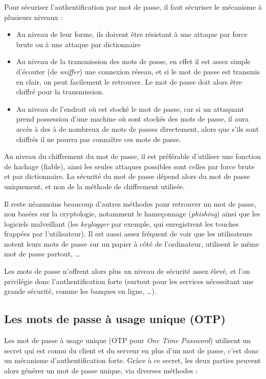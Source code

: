 Pour sécuriser l'authentification par mot de passe, il faut
sécuriser le mécanisme à plusieurs niveaux :
\begin{itemize}
  \item Au niveau de leur forme, ils doivent
être résistant à une attaque par force brute ou à une attaque 
par dictionnaire
  \item Au niveau de la transmission des mots de passe, en effet
il est assez simple d'écouter (de \emph{sniffer}) une connexion
réseau, et si le mot de passe est transmis en clair, on peut
facilement le retrouver. Le mot de passe doit alors être chiffré
pour la transmission.
  \item Au niveau de l'endroit où est stocké le mot de passe, car
si un attaquant prend possession d'une machine où sont stockés
des mots de passe, il aura accès à des à de nombreux de mots
de passes directement, alors que s'ils sont
chiffrés il ne pourra pas connaître ces mots de passe.
\\
\end{itemize}

Au niveau du chiffrement du mot de passe, il est préférable
d'utiliser une fonction de hachage (fiable), ainsi les seules
attaques possibles sont celles par force brute et par
dictionnaire. La sécurité du mot de passe dépend alors du mot de
passe uniquement, et non de la méthode de chiffrement utilisée.

Il reste néanmoins beaucoup d'autres méthodes pour retrouver un mot de
passe, non basées sur la cryptologie, notamment le hameçonnage
(\emph{phishing}) ainsi que les logiciels malveillant (les
\emph{keylogger} par exemple, qui enregistrent les touches
frappées par l'utilisateur). Il est aussi assez fréquent de voir
que les utilisateurs notent leurs mots de passe sur un papier à
côté de l'ordinateur, utilisent le même mot de passe partout, …

Les mots de passe n'offrent alors plus un niveau de sécurité assez
élevé, et l'on privilégie donc l'authentification forte (surtout
pour les services nécessitant une grande sécurité, comme les
banques en ligne, …).

\subsection{Les mots de passe à usage unique (OTP)}
Les mot de passe à usage unique (OTP pour \emph{One Time
Password}) utilisent un secret qui est connu du client et du
serveur en plus d'un mot de passe, c'est donc un mécanisme
d'authentification forte.
Grâce à ce secret, les deux parties peuvent alors générer
un mot de passe unique, via diverses méthodes : 

